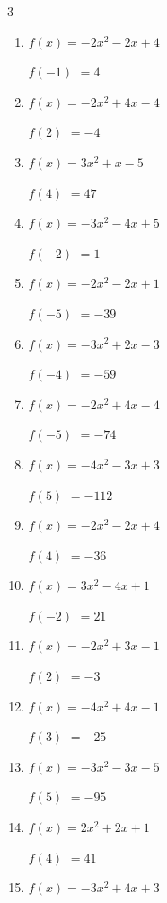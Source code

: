 \begin{multicols}{3}
\begin{enumerate}
$f(5)$
        $= 90$

\columnbreak %

  \item $f(x)=-2x^{2}-2x+4$

$f(-1)$
        $= 4$

  \item $f(x)=-2x^{2}+4x-4$

$f(2)$
        $= -4$

  \item $f(x)=3x^{2}+x-5$

$f(4)$
        $= 47$

  \item $f(x)=-3x^{2}-4x+5$

$f(-2)$
        $= 1$

  \item $f(x)=-2x^{2}-2x+1$

$f(-5)$
        $= -39$

  \item $f(x)=-3x^{2}+2x-3$

$f(-4)$
        $= -59$

  \item $f(x)=-2x^{2}+4x-4$

$f(-5)$
        $= -74$

  \item $f(x)=-4x^{2}-3x+3$

$f(5)$
        $= -112$

  \item $f(x)=-2x^{2}-2x+4$

$f(4)$
        $= -36$

  \item $f(x)=3x^{2}-4x+1$

$f(-2)$
        $= 21$

  \item $f(x)=-2x^{2}+3x-1$

$f(2)$
        $= -3$

  \item $f(x)=-4x^{2}+4x-1$

$f(3)$
        $= -25$

  \item $f(x)=-3x^{2}-3x-5$

$f(5)$
        $= -95$

  \item $f(x)=2x^{2}+2x+1$

$f(4)$
        $= 41$

  \item $f(x)=-3x^{2}+4x+3$


\end{enumerate}
\end{multicols}
